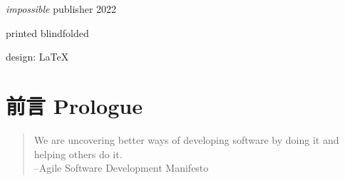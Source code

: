 \documentclass{book}        %
\date{}
\begin{document}
\begin{titlepage}\thispagestyle{empty} \vspace*{3em}{\centering\Huge A++ 敏捷开发小手册 \par}\clearpage
\newpage \thispagestyle{empty} \mbox{} \cleardoublepage
\thispagestyle{empty} \cleardoublepage

\thispagestyle{empty} \vspace*{\fill} \parbox{.8\textwidth}{\raggedright \scriptsize
\textit{impossible} publisher 2022

printed blindfolded

design: \LaTeX
}
\end{titlepage}
\clearpage \thispagestyle{empty}\cleardoublepage
\newpage %


\tableofcontents %

\chapter*{前言 Prologue} %

\begin{quote}
We are uncovering better ways of developing software by doing it and helping others do it.\\
--Agile Software Development Manifesto
\end{quote}
\end{document}
